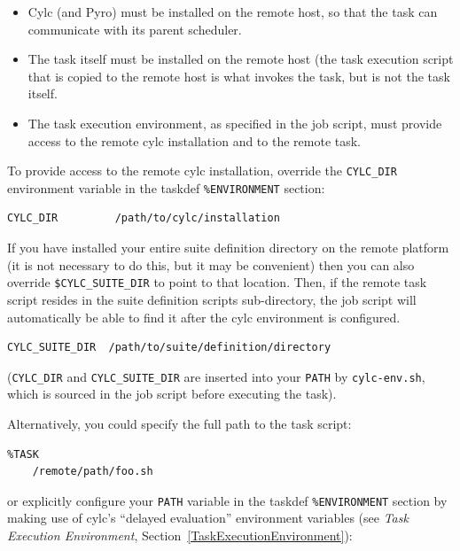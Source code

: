 \documentclass[11pt,a4paper]{article}
\begin{document}
\begin{itemize}

    \item Cylc (and Pyro) must be installed on the remote host, so that 
        the task can communicate with its parent scheduler.
        
    \item The task itself must be installed on the remote host (the task
        execution script that is copied to the remote host is what
        invokes the task, but is not the task itself. 

    \item The task execution environment, as specified in the job
        script, must provide access to the remote cylc
        installation and to the remote task.

\end{itemize}

\lstset{language=cylctaskdef}

To provide access to the remote cylc installation, override the 
\lstinline=CYLC_DIR= environment variable in the taskdef
\lstinline=%ENVIRONMENT= section:

\begin{lstlisting}
CYLC_DIR         /path/to/cylc/installation
\end{lstlisting}

If you have installed your entire suite definition directory on the
remote platform (it is not necessary to do this, but it may be
convenient) then you can also override \lstinline=$CYLC_SUITE_DIR= to
point to that location. Then, if the remote task script resides in the
suite definition scripts sub-directory, the job script will
automatically be able to find it after the cylc environment is
configured.

\begin{lstlisting}
CYLC_SUITE_DIR  /path/to/suite/definition/directory
\end{lstlisting}

(\lstinline=CYLC_DIR=  and \lstinline=CYLC_SUITE_DIR= are inserted
into your \lstinline=PATH= by \lstinline=cylc-env.sh=, which is sourced
in the job script before executing the task).

Alternatively, you could specify the full path to the task script:

\begin{lstlisting}
%TASK
    /remote/path/foo.sh
\end{lstlisting}

or explicitly configure your \lstinline=PATH= variable in the taskdef
\lstinline=%ENVIRONMENT= section by making use of cylc's ``delayed
evaluation'' environment variables (see {\em Task Execution
Environment}, Section~\ref{TaskExecutionEnvironment}):
\end{document}
